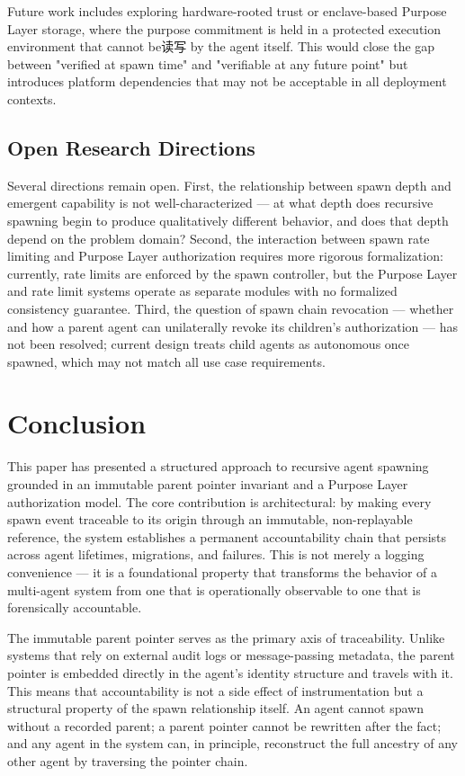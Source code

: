 Future work includes exploring hardware-rooted trust or enclave-based Purpose Layer storage, where the purpose commitment is held in a protected execution environment that cannot be读写 by the agent itself. This would close the gap between "verified at spawn time" and "verifiable at any future point" but introduces platform dependencies that may not be acceptable in all deployment contexts.

\subsection{Open Research Directions}
Several directions remain open. First, the relationship between spawn depth and emergent capability is not well-characterized — at what depth does recursive spawning begin to produce qualitatively different behavior, and does that depth depend on the problem domain? Second, the interaction between spawn rate limiting and Purpose Layer authorization requires more rigorous formalization: currently, rate limits are enforced by the spawn controller, but the Purpose Layer and rate limit systems operate as separate modules with no formalized consistency guarantee. Third, the question of spawn chain revocation — whether and how a parent agent can unilaterally revoke its children's authorization — has not been resolved; current design treats child agents as autonomous once spawned, which may not match all use case requirements.


\section{Conclusion}

This paper has presented a structured approach to recursive agent spawning grounded in an immutable parent pointer invariant and a Purpose Layer authorization model. The core contribution is architectural: by making every spawn event traceable to its origin through an immutable, non-replayable reference, the system establishes a permanent accountability chain that persists across agent lifetimes, migrations, and failures. This is not merely a logging convenience — it is a foundational property that transforms the behavior of a multi-agent system from one that is operationally observable to one that is forensically accountable.

The immutable parent pointer serves as the primary axis of traceability. Unlike systems that rely on external audit logs or message-passing metadata, the parent pointer is embedded directly in the agent's identity structure and travels with it. This means that accountability is not a side effect of instrumentation but a structural property of the spawn relationship itself. An agent cannot spawn without a recorded parent; a parent pointer cannot be rewritten after the fact; and any agent in the system can, in principle, reconstruct the full ancestry of any other agent by traversing the pointer chain.

